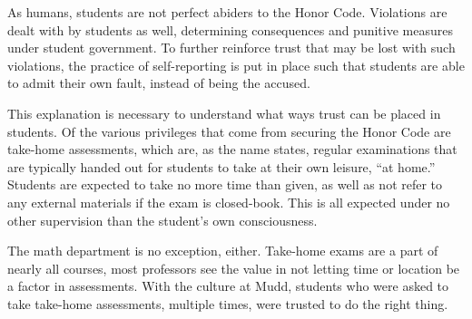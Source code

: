 As humans, students are not perfect abiders to the Honor Code. Violations are dealt with by students as well, determining consequences and punitive measures under student government. To further reinforce trust that may be lost with such violations, the practice of self-reporting is put in place such that students are able to admit their own fault, instead of being the accused.

This explanation is necessary to understand what ways trust can be placed in students. Of the various privileges that come from securing the Honor Code are take-home assessments, which are, as the name states, regular examinations that are typically handed out for students to take at their own leisure, ``at home.'' Students are expected to take no more time than given, as well as not refer to any external materials if the exam is closed-book. This is all expected under no other supervision than the student's own consciousness.

The math department is no exception, either. Take-home exams are a part of nearly all courses, most professors see the value in not letting time or location be a factor in assessments. With the culture at Mudd, students who were asked to take take-home assessments, multiple times, were trusted to do the right thing.
